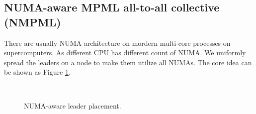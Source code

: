 
\subsection {NUMA-aware MPML all-to-all collective (NMPML)}
There are usually NUMA architecture on mordern multi-core processes on supercomputers.
As different CPU has different count of NUMA.
We uniformly spread the leaders on a node to make them utilize all NUMAs.
The core idea can be shown as Figure \ref{fig:NUMA-Aware}.
\begin{figure}
\centering
{}
\\
\centering
{}
\caption{NUMA-aware leader placement.} %
\label{fig:NUMA-Aware}  %
\end{figure}

